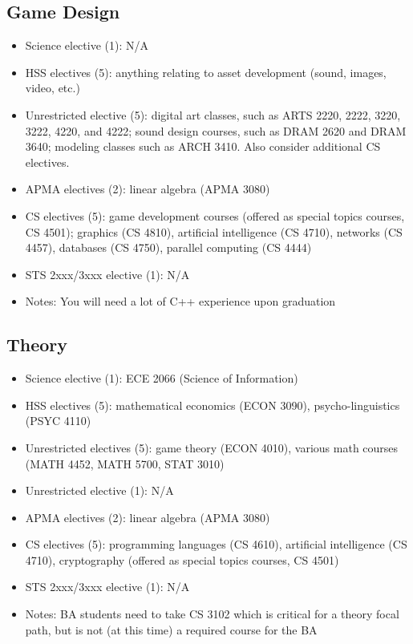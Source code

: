 \documentclass[10pt,letter,twocolumn]{book}
\newenvironment{itemlist}{
\begin{itemize}
\setlength{\itemsep}{0pt}
\setlength{\parskip}{0pt}}
{\end{itemize}}
\begin{document}
\subsection{Game Design}
\begin{itemlist}
\item Science elective (1): N/A
\item HSS electives (5): anything relating to asset development
  (sound, images, video, etc.)
\item Unrestricted elective (5): digital art classes, such as ARTS
  2220, 2222, 3220, 3222, 4220, and 4222; sound design courses, such
  as DRAM 2620 and DRAM 3640; modeling classes such as ARCH 3410.
  Also consider additional CS electives.
\item APMA electives (2): linear algebra (APMA 3080)
\item CS electives (5): game development courses (offered as special
  topics courses, CS 4501); graphics (CS 4810), artificial
  intelligence (CS 4710), networks (CS 4457), databases (CS 4750),
  parallel computing (CS 4444)
\item STS 2xxx/3xxx elective (1): N/A
\item Notes: You will need a lot of C++ experience upon graduation
\end{itemlist}

\subsection{Theory}
\begin{itemlist}
\item Science elective (1): ECE 2066 (Science of Information)
\item HSS electives (5): mathematical economics (ECON 3090),
  psycho-linguistics (PSYC 4110)
\item Unrestricted electives (5): game theory (ECON 4010), various math
  courses (MATH 4452, MATH 5700, STAT 3010)
\item Unrestricted elective (1): N/A
\item APMA electives (2): linear algebra (APMA 3080)
\item CS electives (5): programming languages (CS 4610), artificial
  intelligence (CS 4710), cryptography (offered as special topics
  courses, CS 4501)
\item STS 2xxx/3xxx elective (1): N/A
\item Notes: BA students need to take CS 3102 which is critical for a
  theory focal path, but is not (at this time) a required course for
  the BA
\end{itemlist}
\end{document}
